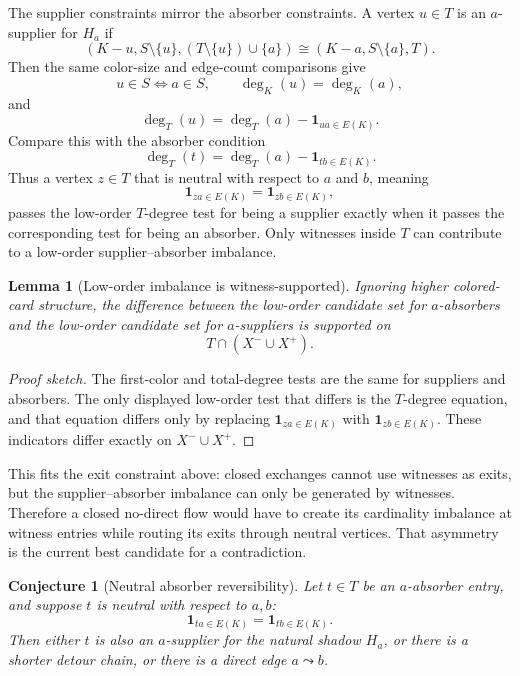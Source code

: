 \documentclass[11pt]{article}
\newtheorem{lemma}{Lemma}
\newtheorem{conjecture}{Conjecture}
\newcommand{\one}{\mathbf{1}}
\begin{document}
The supplier constraints mirror the absorber constraints.  A vertex
\(u\in T\) is an \(a\)-supplier for \(H_a\) if
\[
  (K-u,S\setminus\{u\},(T\setminus\{u\})\cup\{a\})
  \cong
  (K-a,S\setminus\{a\},T).
\]
Then the same color-size and edge-count comparisons give
\[
  u\in S \Longleftrightarrow a\in S,
  \qquad
  \deg_K(u)=\deg_K(a),
\]
and
\[
  \deg_T(u)=\deg_T(a)-\one_{ua\in E(K)}.
\]
Compare this with the absorber condition
\[
  \deg_T(t)=\deg_T(a)-\one_{tb\in E(K)}.
\]
Thus a vertex \(z\in T\) that is neutral with respect to \(a\) and \(b\),
meaning
\[
  \one_{za\in E(K)}=\one_{zb\in E(K)},
\]
passes the low-order \(T\)-degree test for being a supplier exactly when it
passes the corresponding test for being an absorber.  Only witnesses inside
\(T\) can contribute to a low-order supplier--absorber imbalance.

\begin{lemma}[Low-order imbalance is witness-supported]
Ignoring higher colored-card structure, the difference between the low-order
candidate set for \(a\)-absorbers and the low-order candidate set for
\(a\)-suppliers is supported on
\[
  T\cap (X^-\cup X^+).
\]
\end{lemma}

\begin{proof}[Proof sketch]
The first-color and total-degree tests are the same for suppliers and
absorbers.  The only displayed low-order test that differs is the
\(T\)-degree equation, and that equation differs only by replacing
\(\one_{za\in E(K)}\) with \(\one_{zb\in E(K)}\).  These indicators differ
exactly on \(X^-\cup X^+\).
\end{proof}

This fits the exit constraint above: closed exchanges cannot use witnesses as
exits, but the supplier--absorber imbalance can only be generated by
witnesses.  Therefore a closed no-direct flow would have to create its
cardinality imbalance at witness entries while routing its exits through
neutral vertices.  That asymmetry is the current best candidate for a
contradiction.

\begin{conjecture}[Neutral absorber reversibility]
Let \(t\in T\) be an \(a\)-absorber entry, and suppose \(t\) is neutral with
respect to \(a,b\):
\[
  \one_{ta\in E(K)}=\one_{tb\in E(K)}.
\]
Then either \(t\) is also an \(a\)-supplier for the natural shadow \(H_a\), or
there is a shorter detour chain, or there is a direct edge \(a\leadsto b\).
\end{conjecture}
\end{document}
